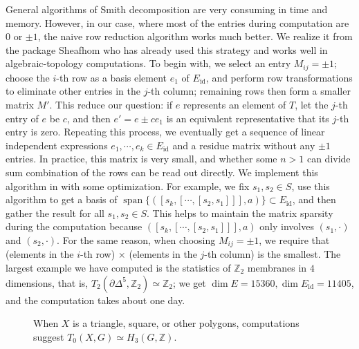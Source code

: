 \documentclass[reprint, amsmath, amssymb, showpacs, floatfix, longbibliography, aps, twocolumn, superscriptaddress, nofootinbib]{revtex4-2}
\newcommand{\ZZ}{{\mathbb Z}}
\theoremstyle{definition}
\begin{document}
General algorithms of Smith decomposition are very consuming in time and memory. However, in our case, where most of the entries during computation are $0$ or $\pm1$, the naive row reduction algorithm works much better. We realize it from the package Sheafhom \cite{sheafhom} who has already used this strategy and works well in algebraic-topology computations. To begin with, we select an entry $M_{ij}=\pm1$; choose the $i$-th row as a basis element $e_1$ of $E_{\operatorname{id}}$, and perform row transformations to eliminate other entries in the $j$-th column; remaining rows then form a smaller matrix $M'$. This reduce our question: if $e$ represents an element of $T$, let the $j$-th entry of $e$ be $c$, and then $e'=e\pm c e_1$ is an equivalent representative that its $j$-th entry is zero. Repeating this process, we eventually get a sequence of linear independent expressions $e_1,\cdots,e_k\in E_{\operatorname{id}}$ and a residue matrix without any $\pm1$ entries. In practice, this matrix is very small, and whether some $n>1$ can divide sum combination of the rows can be read out directly. We implement this algorithm in \cite{GitHubProject} with some optimization. 
 For example, we fix $s_1,s_2\in S$, use this algorithm to get a basis of $\operatorname{span}\{([s_k, [\cdots, [s_2, s_1]]], a)\}\subset E_{\operatorname{id}}$, and then gather the result for all $s_1,s_2\in S$. This helps to maintain the matrix sparsity during the computation because $([s_k, [\cdots, [s_2, s_1]]], a)$ only involves $(s_1,\cdot)$ and $(s_2,\cdot)$. For the same reason, when choosing $M_{ij}=\pm1$, we require that (elements in the $i$-th row) $\times$ (elements in the $j$-th column) is the smallest. The largest example we have computed is the statistics of $\ZZ_2$ membranes in $4$ dimensions, that is, $T_2(\partial\Delta^5,\ZZ_2)\simeq \ZZ_2$; we get $\dim E=15360,\dim E_{\operatorname{id}}=11405$, and the computation takes about one day.
 
 
 
 
 \begin{figure}
 	\centering
 	\caption{When $X$ is a triangle, square, or other polygons, computations suggest $T_0(X,G)\simeq H_3(G,\ZZ)$.}
 	\label{figFSymbol}
 \end{figure}
 
\end{document}
